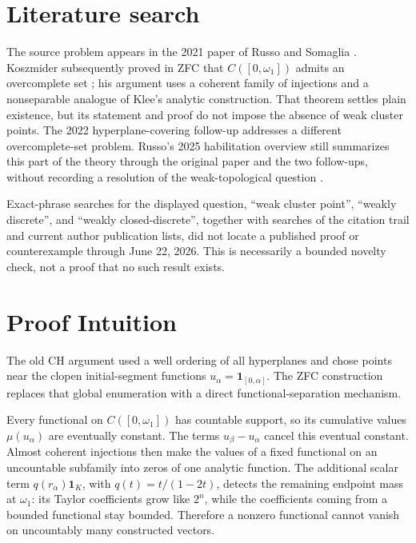\documentclass[11pt]{article}
\theoremstyle{remark}
\newcommand{\one}{\mathbf 1}
\begin{document}
\section{Literature search}

The source problem appears in the 2021 paper of Russo and Somaglia
\cite{RussoSomaglia}.  Koszmider subsequently proved in ZFC that
$C([0,\omega_1])$ admits an overcomplete set \cite[Theorem 11]{Koszmider}; his
argument uses a coherent family of injections and a nonseparable analogue of
Klee's analytic construction.  That theorem settles plain existence, but its
statement and proof do not impose the absence of weak cluster points.  The
2022 hyperplane-covering follow-up \cite{GlodkowskiKoszmider} addresses a
different overcomplete-set problem.  Russo's 2025 habilitation overview still
summarizes this part of the theory through the original paper and the two
follow-ups, without recording a resolution of the weak-topological question
\cite[pp.~16--17]{RussoHab}.

Exact-phrase searches for the displayed question, ``weak cluster point'',
``weakly discrete'', and ``weakly closed-discrete'', together with searches of
the citation trail and current author publication lists, did not locate a
published proof or counterexample through June 22, 2026.  This is necessarily a
bounded novelty check, not a proof that no such result exists.

\section{Proof Intuition}

The old CH argument used a well ordering of all hyperplanes and chose points
near the clopen initial-segment functions \(u_\alpha=\one_{[0,\alpha]}\).
The ZFC construction replaces that global enumeration with a direct
functional-separation mechanism.

Every functional on \(C([0,\omega_1])\) has countable support, so its
cumulative values \(\mu(u_\alpha)\) are eventually constant.  The terms
\(u_\beta-u_\alpha\) cancel this eventual constant.  Almost coherent
injections then make the values of a fixed functional on an uncountable
subfamily into zeros of one analytic function.  The additional scalar term
\(q(r_\alpha)\one_K\), with \(q(t)=t/(1-2t)\), detects the remaining endpoint
mass at \(\omega_1\): its Taylor coefficients grow like \(2^n\), while the
coefficients coming from a bounded functional stay bounded.  Therefore a
nonzero functional cannot vanish on uncountably many constructed vectors.
\end{document}
